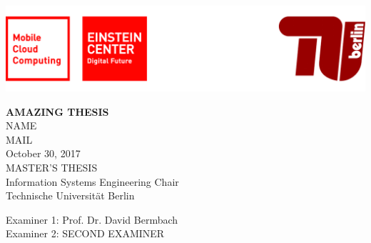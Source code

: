 
\thispagestyle{empty}

\includegraphics[width=\linewidth]{fig/Logo_Header}
\mbox{}\\[1pc]
\begin{center}
\huge{ \bfseries AMAZING THESIS}\\[2pc]

\Large{NAME}\\
\large{MAIL}\\[1pc]
\large{October 30, 2017}\\[2pc]

MASTER'S THESIS\\
Information Systems Engineering Chair\\
Technische Universität Berlin
\end{center}
\vfill

Examiner 1: Prof. Dr. David Bermbach
\hfill{}\\
Examiner 2: SECOND EXAMINER

\afterpage{\null\thispagestyle{empty}\newpage}
